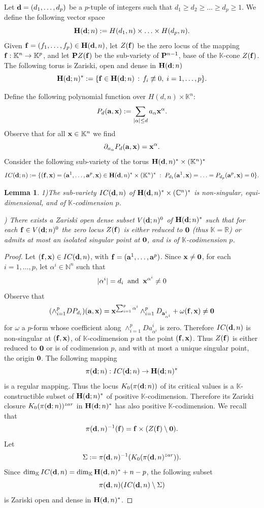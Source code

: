 \documentclass[11pt]{amsart}
\newcommand\tcbl[1]{\textcolor{blue}{#1}}
\newtheorem{lemma}[theorem]{Lemma}
\newcommand{\field}[1]{\mathbb{#1}}
\newcommand{\C}{\field{C}}
\newcommand{\K}{\field{K}}
\newcommand{\N}{\field{N}}
\newcommand{\R}{\field{R}}
\newcommand{\aph}{{\alpha}}
\newcommand{\ba}{{\bf a}}
\newcommand{\bbo}{{\bf 0}}
\newcommand{\bd}{{\bf d}}
\newcommand{\bbf}{{\bf f}}
\newcommand{\bH}{{\bf H}}
\newcommand{\bP}{{\bf P}}
\newcommand{\bx}{{\bf x}}
\newcommand{\Cn}{{\C^n}}
\newcommand{\dd}{{\partial}}
\newcommand{\Kn}{{\K^n}}
\newcommand{\omg}{\omega}
\numberwithin{equation}{section}
\numberwithin{equation}{section}
\begin{document}
Let $\bd = (d_1,\ldots,d_p)$ be a $p$-tuple of integers such that
$d_1\geq d_2 \geq \ldots \geq d_p \geq 1$.
We define the following vector space
$$
\bH(\bd;n) := H(d_1,n) \times \ldots \times H(d_p,n).
$$
Given $\bbf = (f_1,\ldots,f_p) \in \bH(\bd,n)$, 
let $Z(\bbf)$ be the zero locus of the mapping $\bbf :\K^n\to\K^p$, and
let $\bP Z(\bbf)$ be the sub-variety of $\bP^{n-1}$, base of the $\K$-cone 
$Z(\bbf)$. The following torus is Zariski, open and dense in $\bH(\bd;n)$
$$
\bH(\bd;n)^* := \{\bbf \in \bH(\bd;n) \, : \, f_i \not\equiv 0, \; 
i=1,\ldots,p \}.
$$

\medskip
Define the following polynomial function over $H(d,n)\times \K^n$:
$$
P_d(\ba,\bx) := \sum_{|\aph|\leq d} a_\aph \bx^\aph.
$$
Observe that for all $\bx\in \K^n$ we find
$$
\dd_{a_\aph} P_d(\ba,\bx) = \bx^\aph.
$$
Consider the following sub-variety of the torus $\bH(\bd,n)^*\times (\Kn)^*$
$$
IC(\bd;n) := \{(\bbf,\bx) = (\ba^1,\ldots,\ba^p,\bx) \in \bH(\bd,n)^* 
\times (\K^n)^* \; : \; 
P_{d_1}(\ba^1,\bx) = \ldots = P_{d_p}(\ba^p,\bx) = 0\}.
$$
%
%
\begin{lemma}
1)The sub-variety $IC(\bd,n)$ of $\bH(\bd,n)^* \times (\Cn)^*$ is 
non-singular, equi-dimensional, and of $\K$-codimension $p$.

\smallskip{}) There exists a Zariski open dense subset $V(\bd;n)^0$ of $\bH(\bd;n)^*$ such 
that for each $\bbf \in V(\bd;n)^0$ the zero locus $Z(\bbf)$ is either 
reduced to $\bbo$ (thus $\K=\R$) or admits at most an isolated singular 
point at $\bbo$, and is of $\K$-codimension $p$.
\end{lemma}
%
%
\begin{proof}
Let $(\bbf,\bx) \in IC(\bd,n)$, with $\bbf = (\ba^1,\ldots,\ba^p)$.
Since $\bx\neq \bbo$, for each $i=1,\ldots,p$, 
let $\aph^i \in \N^n$ such 
that 
$$
|\aph^i| = d_i \;\; {\rm and} \;\; \bx^{\aph^i}\neq 0 
$$
Observe that
$$
(\wedge_{i=1}^p D P_{d_i})(\ba,\bx) =  \bx^{\sum_{i=1}^p\aph^i} 
\wedge_{i=1}^p D_{\ba_{\aph^i}^i} + \omg(\bbf,\bx) \neq \bbo
$$
for $\omg$ a $p$-form whose coefficient along $\wedge_{i=1}^p Da_{\aph^i}^i$
is zero. Therefore $IC(\bd,n)$ is non-singular at $(\bbf,\bx)$, of 
$\K$-codimension $p$ at the point $(\bbf,\bx)$. 
Thus $Z(\bbf)$ is either reduced to $\bbo$ or is of codimension $p$, and
with at most a unique singular point, the origin $\bbo$.
The 
following mapping
$$
\pi(\bd;n): IC(\bd;n) \to \bH(\bd;n)^*
$$
is a regular mapping. Thus the locus $K_0(\pi(\bd;n))$ of its critical 
values is a $\K$-constructible subset of $\bH(\bd;n)^*$ of positive 
$\K$-codimension. Therefore its Zariski closure $K_0(\pi(\bd;n))^{zar}$
in $\bH(\bd;n)^*$ has also positive $\K$-codimension. We recall that  
$$
\pi(\bd,n)^{-1}(\bbf) = \bbf \times (Z(\bbf)\setminus \bbo). 
$$
Let 
$$
\Sigma := \pi(\bd,n)^{-1}(K_0(\pi(\bd,n)^{zar})).
$$
Since $\dim_\K IC(\bd,n) = \dim_\K \bH(\bd,n)^* + n-p$, the following 
subset   
$$
\pi(\bd,n) (IC(\bd,n)\setminus \Sigma) 
$$
is Zariski open and dense in $\bH(\bd,n)^*$.
\end{proof}
\end{document}
